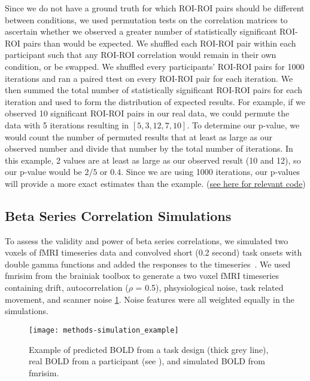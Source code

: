 \documentclass[10pt,letterpaper]{article}
\begin{document}
Since we do not have a ground truth for which ROI-ROI pairs should be different between conditions,
we used permutation tests on the correlation matrices to ascertain whether we observed a greater number
of statistically significant ROI-ROI pairs than would be expected.
We shuffled each ROI-ROI pair within each participant such that any ROI-ROI correlation would remain
in their own condition, or be swapped.
We shuffled every participants' ROI-ROI pairs for 1000 iterations and ran a paired ttest on every ROI-ROI pair
for each iteration.
We then summed the total number of statistically significant ROI-ROI pairs for each iteration and used
to form the distribution of expected results.
For example, if we observed 10 significant ROI-ROI pairs in our real data, we could permute the data
with 5 iterations resulting in $[5, 3, 12, 7, 10]$.
To determine our p-value, we would count the number of permuted results that at least as large as
our observed number and divide that number by the total number of iterations.
In this example, 2 values are at least as large as our observed result (10 and 12), so our
p-value would be $2/5$ or 0.4.
Since we are using 1000 iterations, our p-values will provide a more exact estimates than the example.
(\href{https://github.com/jdkent/BetaSeriesRealDataAnalysis/blob/90fafb5b83b2e1bfade61a9fb1a87f225efaa95f/nibsAnalysis/BetaSeriesAnalysis.ipynb}{see here for relevant code})

\subsection*{Beta Series Correlation Simulations}
\label{methods:bsc-simulations}

To assess the validity and power of beta series correlations,
we simulated two voxels of fMRI timeseries data and convolved short (0.2 second)
task onsets with double gamma functions
and added the responses to the timeseries~\cite{Glover1999,Welvaert2011}.
We used fmrisim from the brainiak toolbox\cite{Ellis2020} to generate a
two voxel fMRI timeseries containing drift, autocorrelation ($\rho$ = 0.5), phsysiological noise,
task related movement, and scanner noise \ref{fig:simulation_example}.
Noise features were all weighted equally in the simulations.

\begin{figure}[H]
  \centering
  \texttt{[image: methods-simulation\_example]}
  \caption{
    Example of predicted BOLD from a task design (thick grey line), real BOLD
    from a participant (see ), and simulated BOLD
    from fmrisim\cite{Ellis2020}.
  }
  \label{fig:simulation_example}
\end{figure}
\end{document}
